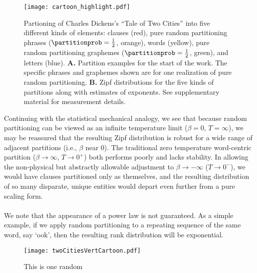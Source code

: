 \begin{figure*}
  \centering
  \texttt{[image: cartoon\_highlight.pdf]}
  \caption{
    Partioning of Charles Dickens's ``Tale of Two Cities''
    into five different kinds of elements: 
    clauses (red),
    pure random partitioning phrases ($\partitionprob=\frac{1}{2}$, orange),
    words (yellow),
    pure random partitioning graphemes ($\partitionprob=\frac{1}{2}$,
    green),
    and
    letters (blue).
    \textbf{A.}
    Partition examples for the start of the work.
    The specific phrases and graphemes shown are for one realization
    of pure random partitioning.
    \textbf{B.}
    Zipf distributions for the five kinds of partitions
    along with estimates of exponents.
    See supplementary material for measurement details.
   }
  \label{fig:tpz.twocities}
\end{figure*}





Continuing with the statistical mechanical analogy,
we see that because random partitioning can be viewed as an infinite 
temperature limit ($\beta=0$, $T=\infty$), we may be reassured that the resulting Zipf
distribution is robust for a wide range of adjacent partitions (i.e., $\beta$ near 0).
The traditional zero temperature word-centric partition 
($\beta \rightarrow \infty$, $T \rightarrow 0^{+}$) 
both performs poorly and lacks stability.
In allowing the non-physical but abstractly allowable adjustment to
$\beta \rightarrow -\infty$ ($T \rightarrow 0^{-}$),
we would have clauses partitioned only as themselves,
and the resulting distribution of so many disparate, unique entities
would depart even further from a pure scaling form.\\
\\
We note that the appearance of a power law is not guaranteed.
As a simple example, if we apply random partitioning to a repeating sequence
of the same word, say `ook', then the resulting rank distribution
will be exponential.


\begin{figure}
  \centering
  \texttt{[image: twoCitiesVertCartoon.pdf]}
  \caption{
    This is one random 
  }
  \label{fig:tpz.twocities}
\end{figure}


